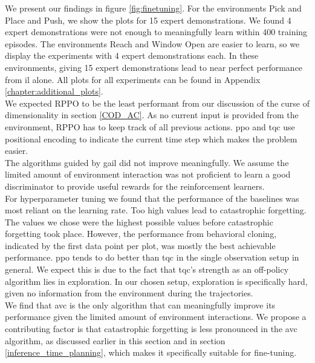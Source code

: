 We present our findings in figure \ref{fig:finetuning}. 
For the environments Pick and Place and Push, we show the plots for 15 expert demonstrations. We found 4 expert demonstrations were not 
enough to meaningfully learn within 400 training episodes. The environments Reach and Window Open are easier to learn, so we display the 
experiments with 4 expert demonstrations each. In these environments, giving 15 expert demonstrations lead to near perfect performance from \ac{il} alone. 
All plots for all experiments can be found in Appendix \ref{chapter:additional_plots}.\\

We expected RPPO to be the least performant from our discussion of the curse of dimensionality in section \ref{COD_AC}. As no current input 
is provided from the environment, RPPO has to keep track of all previous actions. \ac{ppo} and \ac{tqc} use positional encoding to indicate the current 
time step which makes the problem easier.\\ 

The algorithms guided by \ac{gail} did not improve meaningfully. We assume the limited amount of environment 
interaction was not proficient to learn a good discriminator to provide useful rewards for the reinforcement learners.\\ 

For hyperparameter tuning we found that the performance of the baselines was most 
reliant on the learning rate. Too high values lead to catastrophic forgetting. The values we chose were the highest possible values before 
catastrophic forgetting took place. However, the performance from behavioral cloning, indicated by the first data point per plot, was mostly 
the best achievable performance. \ac{ppo} tends to do better than \ac{tqc} in the single observation setup in general. We expect this is due to the 
fact that \ac{tqc}'s strength as an off-policy algorithm lies in exploration. In our chosen setup, exploration is specifically hard, given no 
information from the environment during the trajectories.\\

We find that \ac{avc} is the only algorithm that can meaningfully improve its performance given the limited amount of environment interactions. 
We propose a contributing factor is that catastrophic forgetting is less pronounced in the \ac{avc} algorithm, as discussed earlier in this section and in section \ref{inference_time_planning}, 
which makes it specifically suitable for fine-tuning.



